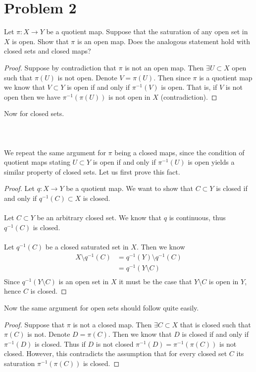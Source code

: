 \documentclass{article}
\theoremstyle{definition}
\begin{document}
\section*{Problem 2}
\begin{mdframed}
    Let $\pi : X \rightarrow Y$ be a quotient map. Suppose that the saturation of any open set in $X$ is open.
    Show that $\pi$ is an open map. Does the analogous statement hold with closed sets and closed maps?
\end{mdframed}
\begin{proof}
    Suppose by contradiction that $\pi$ is not an open map.
    Then $\exists U \subset X$ open such that $\pi(U)$ is not open.
    Denote $V = \pi(U)$. Then since $\pi$ is a quotient map we know that $V \subset Y$ is 
    open if and only if $\pi^{-1}(V)$ is open. That is, if $V$ is not open then we have 
    $\pi^{-1}(\pi(U))$ is not open in $X$ (contradiction).
\end{proof}
Now for closed sets.\\\\
\\\\
We repeat the same argument for $\pi$ being a closed maps, since the condition of quotient maps stating
$U \subset Y$ is open if and only if $\pi^{-1}(U)$ is open yields a similar property of closed sets.
Let us first prove this fact.
\begin{proof}
    Let $q:X\rightarrow Y$ be a quotient map. We want to show that $C \subset Y$ is closed if and only if
    $q^{-1}(C) \subset X$ is closed.\\\\
    \fbox{$\Rightarrow$} Let $C \subset Y$ be an arbitrary closed set. We know that $q$ is continuous, thus $q^{-1}(C)$ is closed.
    \\\\
    \fbox{$\Leftarrow$} Let $q^{-1}(C)$ be a closed saturated set in $X$. 
    Then we know
    \begin{align*}
        X \setminus q^{-1}(C) &= q^{-1}(Y) \setminus q^{-1}(C)\\
        &= q^{-1}(Y \setminus C) \\
    \end{align*}
    Since $q^{-1}(Y \setminus C)$ is an open set in $X$ it must be the case that $Y \setminus C$ is open in $Y$,
    hence $C$ is closed.
\end{proof}
Now the same argument for open sets should follow quite easily.
\begin{proof}
    Suppose that $\pi$ is not a closed map. Then $\exists C \subset X$ that is closed such that $\pi(C)$ is not.
    Denote $D = \pi(C)$. Then we know that $D$ is closed if and only if $\pi^{-1}(D)$ is closed. Thus if $D$ is
    not closed $\pi^{-1}(D) = \pi^{-1}(\pi(C))$ is not closed. However, this contradicts the assumption that for 
    every closed set $C$ its saturation $\pi^{-1}(\pi(C))$ is closed.
\end{proof}
\end{document}
